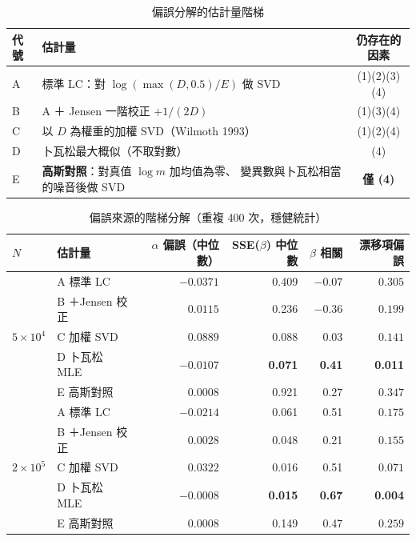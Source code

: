 \documentclass[UTF8, fontset=macnew, a4paper, 12pt]{ctexart}
\begin{document}
\begin{table}[H]
\centering
\caption{偏誤分解的估計量階梯}
\small
\begin{tabular}{llc}
\toprule
代號 & 估計量 & 仍存在的因素\\
\midrule
A & 標準 LC：對 $\log(\max(D,0.5)/E)$ 做 SVD & (1)(2)(3)(4)\\
B & A ＋ Jensen 一階校正 $+1/(2D)$ & (1)(3)(4)\\
C & 以 $D$ 為權重的加權 SVD（Wilmoth 1993） & (1)(2)(4)\\
D & 卜瓦松最大概似（不取對數） & (4)\\
E & \textbf{高斯對照}：對真值 $\log m$ 加均值為零、
    變異數與卜瓦松相當的噪音後做 SVD & \textbf{僅 (4)}\\
\bottomrule
\end{tabular}
\label{tab:ladder}
\end{table}
\begin{table}[H]
\centering
\caption{偏誤來源的階梯分解（重複 400 次，穩健統計）}
\small
\begin{tabular}{llrrrr}
\toprule
$N$ & 估計量 & $\alpha$ 偏誤（中位數） & SSE($\beta$) 中位數
 & $\beta$ 相關 & 漂移項偏誤\\
\midrule
\multirow{5}{*}{$5\times10^4$}
 & A 標準 LC        & $-0.0371$ & 0.409 & $-0.07$ & $0.305$\\
 & B ＋Jensen 校正  & $\phantom{-}0.0115$ & 0.236 & $-0.36$ & $0.199$\\
 & C 加權 SVD       & $\phantom{-}0.0889$ & 0.088 & $\phantom{-}0.03$ & $0.141$\\
 & D 卜瓦松 MLE     & $-0.0107$ & \textbf{0.071} & \textbf{0.41} & \textbf{0.011}\\
 & E 高斯對照       & $\phantom{-}\mathbf{0.0008}$ & 0.921 & $\phantom{-}0.27$ & $\mathbf{0.347}$\\
\midrule
\multirow{5}{*}{$2\times10^5$}
 & A 標準 LC        & $-0.0214$ & 0.061 & 0.51 & $0.175$\\
 & B ＋Jensen 校正  & $\phantom{-}0.0028$ & 0.048 & 0.21 & $0.155$\\
 & C 加權 SVD       & $\phantom{-}0.0322$ & 0.016 & 0.51 & $0.071$\\
 & D 卜瓦松 MLE     & $-0.0008$ & \textbf{0.015} & \textbf{0.67} & \textbf{0.004}\\
 & E 高斯對照       & $\phantom{-}\mathbf{0.0008}$ & 0.149 & 0.47 & $\mathbf{0.259}$\\
\bottomrule
\end{tabular}
\label{tab:decomp}
\end{table}
\end{document}
